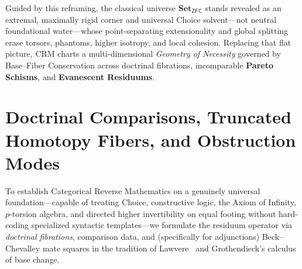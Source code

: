 \documentclass[10pt,twoside,openright]{book}
\theoremstyle{crmplain}
\theoremstyle{crmdef}
\theoremstyle{crmremark}
\begin{document}
Guided by this reframing, the classical universe $\mathbf{Set}_{\mathsf{ZFC}}$ stands revealed as an extremal, maximally rigid corner and universal Choice solvent---not neutral foundational water---whose point-separating extensionality and global splitting erase torsors, phantoms, higher isotropy, and local cohesion. Replacing that flat picture, $\mathrm{CRM}$ charts a multi-dimensional \emph{Geometry of Necessity} governed by Base--Fiber Conservation across doctrinal fibrations, incomparable \textbf{Pareto Schisms}, and \textbf{Evanescent Residuums}.

\section{Doctrinal Comparisons, Truncated Homotopy Fibers, and Obstruction Modes}\label{sec:fundamental-equivalence}

To establish Categorical Reverse Mathematics on a genuinely universal foundation---capable of treating Choice, constructive logic, the Axiom of Infinity, $p$-torsion algebra, and directed higher invertibility on equal footing without hard-coding specialized syntactic templates---we formulate the residuum operator via \emph{doctrinal fibrations}, comparison data, and (specifically for adjunctions) Beck--Chevalley mate squares in the tradition of Lawvere~\cite{Lawvere69,Maietti05,Johnstone02} and Grothendieck's calculus of base change.
\end{document}
